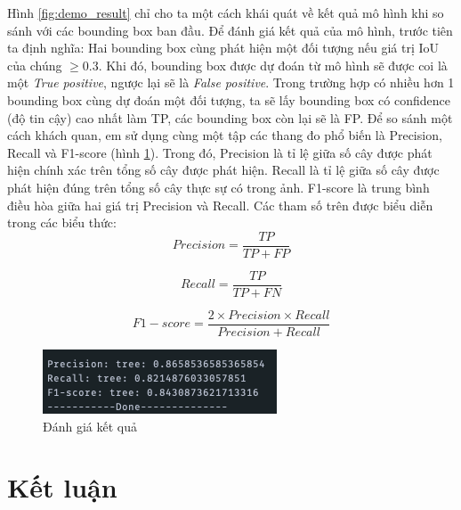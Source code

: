 \documentclass[a4paper, 12pt]{report}
\begin{document}
Hình \ref{fig:demo_result} chỉ cho ta một cách khái quát về kết quả mô hình khi so sánh với các bounding box ban đầu.  Để đánh giá kết quả của mô hình,  trước tiên ta định nghĩa: Hai bounding box cùng phát hiện một đối tượng nếu giá trị IoU của chúng $\geq 0.3$. Khi đó,  bounding box được dự đoán từ mô hình sẽ được coi là một \textit{True positive},  ngược lại sẽ là \textit{False positive}.  Trong trường hợp có nhiều hơn 1 bounding box cùng dự đoán một đối tượng,  ta sẽ lấy bounding box có confidence (độ tin cậy) cao nhất làm TP, các bounding box còn lại sẽ là FP.  Để so sánh một cách khách quan, em sử dụng cùng một tập các thang đo phổ biến là Precision, Recall và F1-score (hình \ref{fig:res_pre_rec}).  Trong đó, Precision là tỉ lệ giữa số cây được phát hiện chính xác trên tổng số cây được phát hiện. Recall là tỉ lệ giữa số cây được phát hiện đúng trên tổng số cây thực sự  có trong ảnh. F1-score là trung bình điều hòa giữa hai giá trị Precision và Recall.  Các tham số trên được biểu diễn trong các biểu thức:
\begin{equation*}
	Precision = \frac{TP}{TP + FP}
\end{equation*}

\begin{equation*}
	Recall = \frac{TP}{TP + FN}
\end{equation*}

\begin{equation*}
	F1 - score = \frac{2 \times Precision \times Recall}{Precision + Recall}
\end{equation*}
\begin{figure}[!h]
	\centering
  	\includegraphics[width=.8\linewidth]{Images/f1-score} %
 	 \caption{Đánh giá kết quả}
 	 \label{fig:res_pre_rec}
\end{figure}


\chapter{Kết luận}\
\end{document}
